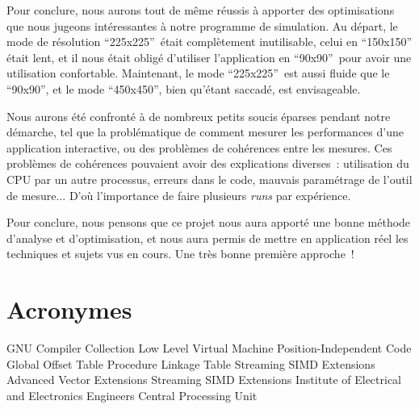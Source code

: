 \documentclass[12pt,a4paper]{article}
\begin{document}
Pour conclure, nous aurons tout de même réussis à apporter des optimisations que
nous jugeons intéressantes à notre programme de simulation. Au départ, le mode
de résolution \enquote{225x225} était complètement inutilisable, celui en
\enquote{150x150} était lent, et il nous était obligé d'utiliser l'application
en \enquote{90x90} pour avoir une utilisation confortable. Maintenant, le mode
\enquote{225x225} est aussi fluide que le \enquote{90x90}, et le mode
\enquote{450x450}, bien qu'étant saccadé, est envisageable.

Nous aurons été confronté à de nombreux petits soucis éparses pendant notre
démarche, tel que la problématique de comment mesurer les performances d'une
application interactive, ou des problèmes de cohérences entre les mesures. Ces
problèmes de cohérences pouvaient avoir des explications diverses : utilisation
du \acs{CPU} par un autre processus, erreurs dans le code, mauvais paramétrage de
l'outil de mesure... D'où l'importance de faire plusieurs \textit{runs} par
expérience.

Pour conclure, nous pensons que ce projet nous aura apporté une bonne méthode
d'analyse et d'optimisation, et nous aura permis de mettre en application réel
les techniques et sujets vus en cours. Une très bonne première approche !

\newpage
\section*{Acronymes}
\label{sec.acro}

\begin{acronym}
      {GNU Compiler Collection}
     {Low Level Virtual Machine}
      {Position-Independent Code}
      {Global Offset Table}
      {Procedure Linkage Table}
      {Streaming SIMD Extensions}
      {Advanced Vector Extensions}
      {Streaming SIMD Extensions}
     {Institute of Electrical and Electronics Engineers}
      {Central Processing Unit}
\end{acronym}
\end{document}
